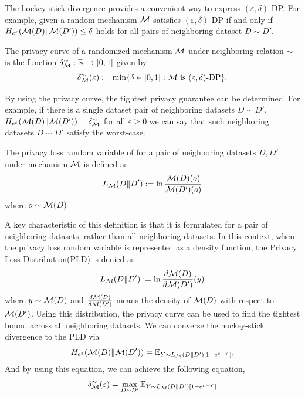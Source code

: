 \documentclass{article}
\begin{document}
The hockey-stick divergence provides a convenient way to express $(\varepsilon,\delta)$-DP. For example, given a random mechanism ${\mathcal{M}}$ satisfies $(\varepsilon,\delta)$-DP if and only if $H_{e^\varepsilon} ({\mathcal{M}}(D) \Vert {\mathcal{M}} (D')) \le \delta$ holds for all pairs of neighboring dataset $D\sim D'$.

\begin{definition}
The privacy curve of a randomized mechanism ${\mathcal{M}}$ under neighboring relation $\sim$ is the function $\delta_{\mathcal{M}} ^\sim : {\mathbb{R}} \to [0,1]$ given by
\begin{equation*}
    \delta_{\mathcal{M}} ^\sim(\varepsilon) := \min \{ \delta \in [0,1] : \text{${\mathcal{M}}$ is $(\varepsilon,\delta)$-DP\}}.
\end{equation*}
\end{definition}

By using the privacy curve, the tightest privacy guarantee can be determined. For example, if there is a single dataset pair of neighboring datasets $D \sim D'$, $H_{e^\varepsilon} ({\mathcal{M}}(D) \Vert {\mathcal{M}} (D')) = \delta_{\mathcal{M}}^\sim$ for all $\varepsilon \ge 0$ we can say that such neighboring datasets $D \sim D'$ satisfy the worst-case.

\begin{definition}
The privacy loss random variable of for a pair of neighboring datasets $D, D'$ under mechanism ${\mathcal{M}}$ is defined as
\begin{equation*}
    L_{\mathcal{M}} (D\Vert D') := \ln \frac{{\mathcal{M}} (D)(o)}{{\mathcal{M}} (D')(o)}
\end{equation*}
where $o \sim {\mathcal{M}} (D)$
\end{definition}

A key characteristic of this definition is that it is formulated for a pair of neighboring datasets, rather than all neighboring datasets. In this context, when the privacy loss random variable is represented as a density function, the Privacy Loss Distribution(PLD) is denied as
\begin{equation*}
    L_{\mathcal{M}} (D \Vert D') := \ln \frac{d {\mathcal{M}}(D)}{d {\mathcal{M}}(D')}(y)
\end{equation*} 
where $y \sim {\mathcal{M}}(D)$ and $\frac{d {\mathcal{M}}(D)}{d {\mathcal{M}}(D')}$ means the density of ${\mathcal{M}}(D)$ with respect to ${\mathcal{M}}(D')$. Using this distribution, the privacy curve can be used to find the tightest bound across all neighboring datasets. We can converse the hockey-stick divergence to the PLD via
\begin{equation*}
    H_{e^\varepsilon}({\mathcal{M}}(D) \Vert {\mathcal{M}}(D')) = \mathbb{E}_{Y \sim L_{\mathcal{M}} (D \Vert D') [1-e^{\varepsilon-Y}]},
\end{equation*}
And by using this equation, we can achieve the following equation,
\begin{equation*}
    \delta_{\mathcal{M}}^\sim (\varepsilon) = \max_{D\sim D'} \mathbb{E}_{Y \sim L_{\mathcal{M}} (D \Vert D') [1-e^{\varepsilon-Y}]}
\end{equation*}
\end{document}
